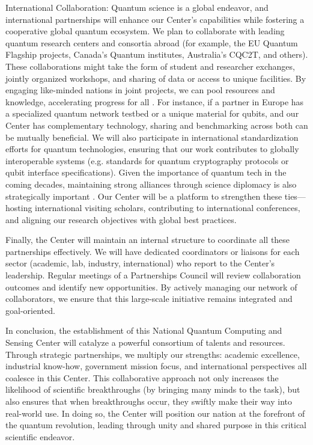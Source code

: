 \documentclass[12pt]{article}
\begin{document}
International Collaboration: Quantum science is a global endeavor, and international partnerships will enhance our Center’s capabilities while fostering a cooperative global quantum ecosystem. We plan to collaborate with leading quantum research centers and consortia abroad (for example, the EU Quantum Flagship projects, Canada’s Quantum institutes, Australia’s CQC2T, and others). These collaborations might take the form of student and researcher exchanges, jointly organized workshops, and sharing of data or access to unique facilities. By engaging like-minded nations in joint projects, we can pool resources and knowledge, accelerating progress for all . For instance, if a partner in Europe has a specialized quantum network testbed or a unique material for qubits, and our Center has complementary technology, sharing and benchmarking across both can be mutually beneficial. We will also participate in international standardization efforts for quantum technologies, ensuring that our work contributes to globally interoperable systems (e.g. standards for quantum cryptography protocols or qubit interface specifications). Given the importance of quantum tech in the coming decades, maintaining strong alliances through science diplomacy is also strategically important . Our Center will be a platform to strengthen these ties—hosting international visiting scholars, contributing to international conferences, and aligning our research objectives with global best practices.



Finally, the Center will maintain an internal structure to coordinate all these partnerships effectively. We will have dedicated coordinators or liaisons for each sector (academic, lab, industry, international) who report to the Center’s leadership. Regular meetings of a Partnerships Council will review collaboration outcomes and identify new opportunities. By actively managing our network of collaborators, we ensure that this large-scale initiative remains integrated and goal-oriented.



In conclusion, the establishment of this National Quantum Computing and Sensing Center will catalyze a powerful consortium of talents and resources. Through strategic partnerships, we multiply our strengths: academic excellence, industrial know-how, government mission focus, and international perspectives all coalesce in this Center. This collaborative approach not only increases the likelihood of scientific breakthroughs (by bringing many minds to the task), but also ensures that when breakthroughs occur, they swiftly make their way into real-world use. In doing so, the Center will position our nation at the forefront of the quantum revolution, leading through unity and shared purpose in this critical scientific endeavor.



\vfill{}
\end{document}
